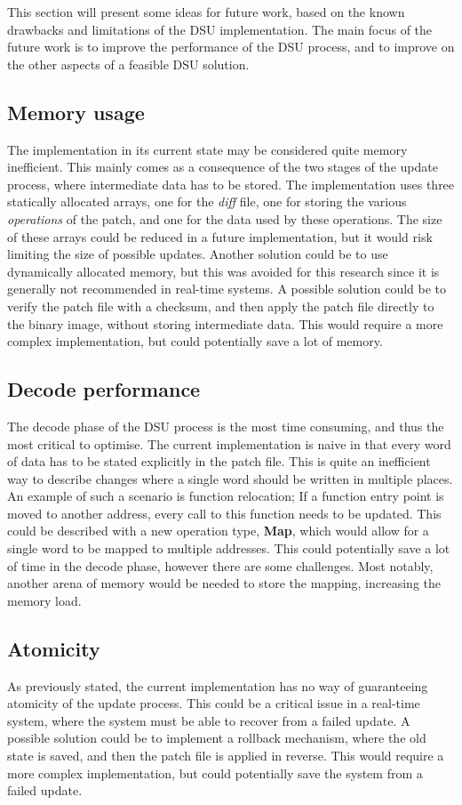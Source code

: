 This section will present some ideas for future work, based on the known drawbacks and limitations of the DSU implementation. The main focus of the future work is to improve the performance of the DSU process, and to improve on the other aspects of a feasible DSU solution.
\subsection*{Memory usage}
The implementation in its current state may be considered quite memory inefficient. This mainly comes as a consequence of the two stages of the update process, where intermediate data has to be stored. The implementation uses three statically allocated arrays, one for the \textit{diff} file, one for storing the various \textit{operations} of the patch, and one for the data used by these operations. The size of these arrays could be reduced in a future implementation, but it would risk limiting the size of possible updates. Another solution could be to use dynamically allocated memory, but this was avoided for this research since it is generally not recommended in real-time systems. A possible solution could be to verify the patch file with a checksum, and then apply the patch file directly to the binary image, without storing intermediate data. This would require a more complex implementation, but could potentially save a lot of memory.

\subsection*{Decode performance}
The decode phase of the DSU process is the most time consuming, and thus the most critical to optimise. The current implementation is naive in that every word of data has to be stated explicitly in the patch file. This is quite an inefficient way to describe changes where a single word should be written in multiple places. An example of such a scenario is function relocation; If a function entry point is moved to another address, every call to this function needs to be updated. This could be described with a new operation type, \textbf{Map}, which would allow for a single word to be mapped to multiple addresses. This could potentially save a lot of time in the decode phase, however there are some challenges. Most notably, another arena of memory would be needed to store the mapping, increasing the memory load. 

\subsection*{Atomicity}
As previously stated, the current implementation has no way of guaranteeing atomicity of the update process. This could be a critical issue in a real-time system, where the system must be able to recover from a failed update. A possible solution could be to implement a rollback mechanism, where the old state is saved, and then the patch file is applied in reverse. This would require a more complex implementation, but could potentially save the system from a failed update.
